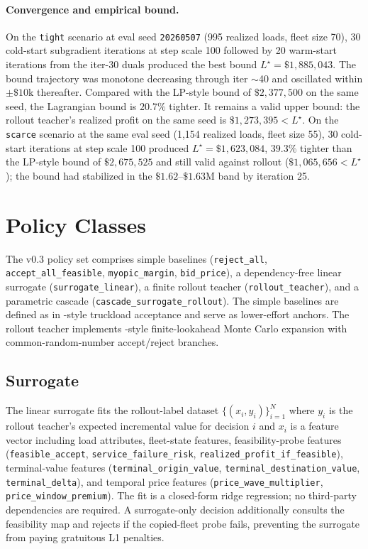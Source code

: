 \documentclass[11pt]{article}
\begin{document}
\paragraph{Convergence and empirical bound.}
On the \texttt{tight} scenario at eval seed \texttt{20260507} (995
realized loads, fleet size 70), 30 cold-start subgradient iterations at
step scale 100 followed by 20 warm-start iterations from the iter-30
duals produced the best bound $L^\star = \$1{,}885{,}043$. The bound
trajectory was monotone decreasing through iter $\sim$40 and oscillated
within $\pm \$10$k thereafter. Compared with the LP-style bound of
$\$2{,}377{,}500$ on the same seed, the Lagrangian bound is $20.7\%$
tighter. It remains a valid upper bound: the rollout teacher's
realized profit on the same seed is $\$1{,}273{,}395 < L^\star$. On the
\texttt{scarce} scenario at the same eval seed (1{,}154 realized loads,
fleet size 55), 30 cold-start iterations at step scale 100 produced
$L^\star = \$1{,}623{,}084$, $39.3\%$ tighter than the LP-style bound of
$\$2{,}675{,}525$ and still valid against rollout
($\$1{,}065{,}656 < L^\star$); the bound had stabilized in the
$\$1.62$--$\$1.63$M band by iteration 25.

\section{Policy Classes}
\label{sec:policies}

The v0.3 policy set comprises simple baselines (\texttt{reject\_all},
\texttt{accept\_all\_feasible}, \texttt{myopic\_margin}, \texttt{bid\_price}),
a dependency-free linear surrogate (\texttt{surrogate\_linear}), a finite
rollout teacher (\texttt{rollout\_teacher}), and a parametric cascade
(\texttt{cascade\_surrogate\_rollout}). The simple baselines are defined
as in \citet{kim2004dynamic}-style truckload acceptance and serve as
lower-effort anchors. The rollout teacher implements
\citet{bertsekas1997rollout}-style finite-lookahead Monte Carlo expansion
with common-random-number accept/reject branches.

\subsection{Surrogate}

The linear surrogate fits the rollout-label dataset
$\{(x_i, y_i)\}_{i=1}^{N}$ where $y_i$ is the rollout teacher's expected
incremental value for decision $i$ and $x_i$ is a feature vector
including load attributes, fleet-state features, feasibility-probe
features (\texttt{feasible\_accept}, \texttt{service\_failure\_risk},
\texttt{realized\_profit\_if\_feasible}), terminal-value features
(\texttt{terminal\_origin\_value}, \texttt{terminal\_destination\_value},
\texttt{terminal\_delta}), and temporal price features
(\texttt{price\_wave\_multiplier}, \texttt{price\_window\_premium}). The
fit is a closed-form ridge regression; no third-party dependencies are
required. A surrogate-only decision additionally consults the feasibility
map and rejects if the copied-fleet probe fails, preventing the surrogate
from paying gratuitous L1 penalties.
\end{document}

